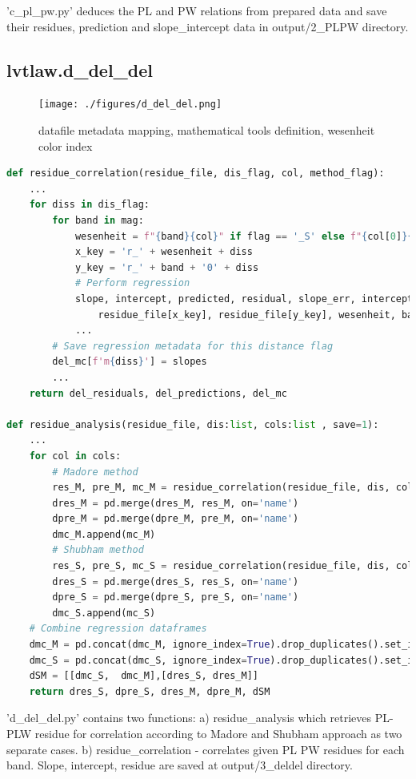 \documentclass{article}
\begin{document}
'c\_pl\_pw.py' deduces the PL and PW relations from prepared data and save their residues, prediction and slope\_intercept data in output/2\_PLPW directory.


\newpage
\subsection{lvtlaw.d\_del\_del}
\begin{figure}[h!]
\caption{\small datafile metadata mapping, mathematical tools definition, wesenheit color index}
\texttt{[image: ./figures/d\_del\_del.png]}
\end{figure}


\begin{lstlisting}[language=Python, caption=dependencies for main.py]
def residue_correlation(residue_file, dis_flag, col, method_flag):
    ...
    for diss in dis_flag:
        for band in mag:
            wesenheit = f"{band}{col}" if flag == '_S' else f"{col[0]}{col}"
            x_key = 'r_' + wesenheit + diss
            y_key = 'r_' + band + '0' + diss
            # Perform regression
            slope, intercept, predicted, residual, slope_err, intercept_err = regression(
                residue_file[x_key], residue_file[y_key], wesenheit, band + '0' + diss, 1)
            ...
        # Save regression metadata for this distance flag
        del_mc[f'm{diss}'] = slopes
        ...
    return del_residuals, del_predictions, del_mc

def residue_analysis(residue_file, dis:list, cols:list , save=1):
    ...
    for col in cols:
        # Madore method
        res_M, pre_M, mc_M = residue_correlation(residue_file, dis, col, 'M')
        dres_M = pd.merge(dres_M, res_M, on='name')
        dpre_M = pd.merge(dpre_M, pre_M, on='name')
        dmc_M.append(mc_M)
        # Shubham method
        res_S, pre_S, mc_S = residue_correlation(residue_file, dis, col, 'S')
        dres_S = pd.merge(dres_S, res_S, on='name')
        dpre_S = pd.merge(dpre_S, pre_S, on='name')
        dmc_S.append(mc_S)
    # Combine regression dataframes
    dmc_M = pd.concat(dmc_M, ignore_index=True).drop_duplicates().set_index('name').T
    dmc_S = pd.concat(dmc_S, ignore_index=True).drop_duplicates().set_index('name').T
    dSM = [[dmc_S,  dmc_M],[dres_S, dres_M]]
    return dres_S, dpre_S, dres_M, dpre_M, dSM

\end{lstlisting}

'd\_del\_del.py' contains two functions: a) residue\_analysis which retrieves PL-PLW residue for correlation according to Madore and Shubham approach as two separate cases. b) residue\_correlation - correlates given PL PW residues for each band. Slope, intercept, residue are saved at output/3\_deldel directory.
\end{document}
